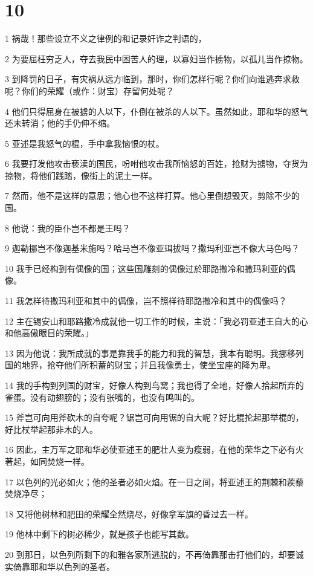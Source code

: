 \chapter{10}

\par 1 祸哉！那些设立不义之律例的和记录奸诈之判语的，
\par 2 为要屈枉穷乏人，夺去我民中困苦人的理，以寡妇当作掳物，以孤儿当作掠物。
\par 3 到降罚的日子，有灾祸从远方临到，那时，你们怎样行呢？你们向谁逃奔求救呢？你们的荣耀（或作：财宝）存留何处呢？
\par 4 他们只得屈身在被掳的人以下，仆倒在被杀的人以下。虽然如此，耶和华的怒气还未转消；他的手仍伸不缩。
\par 5 亚述是我怒气的棍，手中拿我恼恨的杖。
\par 6 我要打发他攻击亵渎的国民，吩咐他攻击我所恼怒的百姓，抢财为掳物，夺货为掠物，将他们践踏，像街上的泥土一样。
\par 7 然而，他不是这样的意思；他心也不这样打算。他心里倒想毁灭，剪除不少的国。
\par 8 他说：我的臣仆岂不都是王吗？
\par 9 迦勒挪岂不像迦基米施吗？哈马岂不像亚珥拔吗？撒玛利亚岂不像大马色吗？
\par 10 我手已经构到有偶像的国；这些国雕刻的偶像过於耶路撒冷和撒玛利亚的偶像。
\par 11 我怎样待撒玛利亚和其中的偶像，岂不照样待耶路撒冷和其中的偶像吗？
\par 12 主在锡安山和耶路撒冷成就他一切工作的时候，主说：「我必罚亚述王自大的心和他高傲眼目的荣耀。」
\par 13 因为他说：我所成就的事是靠我手的能力和我的智慧，我本有聪明。我挪移列国的地界，抢夺他们所积蓄的财宝；并且我像勇士，使坐宝座的降为卑。
\par 14 我的手构到列国的财宝，好像人构到鸟窝；我也得了全地，好像人拾起所弃的雀蛋。没有动翅膀的；没有张嘴的，也没有鸣叫的。
\par 15 斧岂可向用斧砍木的自夸呢？锯岂可向用锯的自大呢？好比棍抡起那举棍的，好比杖举起那非木的人。
\par 16 因此，主万军之耶和华必使亚述王的肥壮人变为瘦弱，在他的荣华之下必有火著起，如同焚烧一样。
\par 17 以色列的光必如火；他的圣者必如火焰。在一日之间，将亚述王的荆棘和蒺藜焚烧净尽；
\par 18 又将他树林和肥田的荣耀全然烧尽，好像拿军旗的昏过去一样。
\par 19 他林中剩下的树必稀少，就是孩子也能写其数。
\par 20 到那日，以色列所剩下的和雅各家所逃脱的，不再倚靠那击打他们的，却要诚实倚靠耶和华以色列的圣者。

